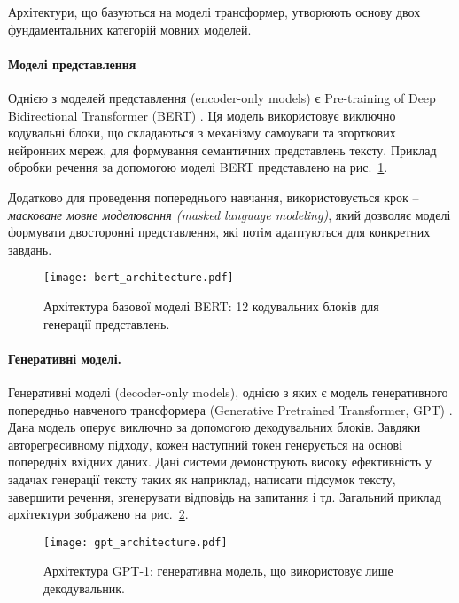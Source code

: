 Архітектури, що базуються на моделі трансформер, утворюють основу двох фундаментальних категорій мовних моделей.

\paragraph{Моделі представлення}
Однією з моделей представлення (encoder-only models) є Pre-training of Deep Bidirectional Transformer (BERT) \cite{devlin2019bertpretrainingdeepbidirectional}. Ця модель використовує виключно кодувальні блоки, що складаються з механізму самоуваги та згорткових нейронних мереж, для формування семантичних представлень тексту. Приклад обробки речення за допомогою моделі BERT представлено на рис.~\ref{fig:bert_architecture}.

Додатково для проведення попереднього навчання, використовується крок -- \emph{масковане мовне моделювання (masked language modeling)}, який дозволяє моделі формувати двосторонні представлення, які потім адаптуються для конкретних завдань.

\begin{figure}[h]
    \centering
    \texttt{[image: bert\_architecture.pdf]}
    \caption{Архітектура базової моделі BERT: 12 кодувальних блоків для генерації представлень.}
    \label{fig:bert_architecture}
\end{figure}

\paragraph{Генеративні моделі.}

Генеративні моделі (decoder-only models), однією з яких є модель генеративного попередньо навченого трансформера (Generative Pretrained Transformer, GPT) \cite{yenduri2023generativepretrainedtransformercomprehensive}. Дана модель оперує виключно за допомогою декодувальних блоків. Завдяки авторегресивному підходу, кожен наступний токен генерується на основі попередніх вхідних даних. Дані системи демонструють високу ефективність у задачах генерації тексту таких як наприклад, написати підсумок тексту, завершити речення, згенерувати відповідь на запитання і тд. Загальний приклад архітектури зображено на рис.~\ref{fig:gpt_architecture}.

\begin{figure}[h]
    \centering
    \texttt{[image: gpt\_architecture.pdf]}
    \caption{Архітектура GPT-1: генеративна модель, що використовує лише декодувальник.}
    \label{fig:gpt_architecture}
\end{figure}

